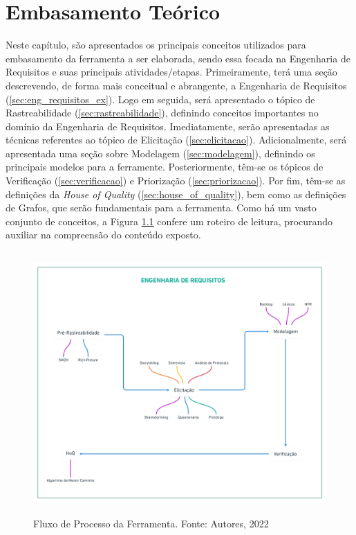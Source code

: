 \chapter[Embasamento Teórico]{Embasamento Teórico}

Neste capítulo, são apresentados os principais conceitos utilizados para embasamento da ferramenta a ser elaborada, sendo essa focada na Engenharia de Requisitos e suas principais atividades/etapas. Primeiramente, terá uma seção descrevendo, de forma mais conceitual e abrangente, a Engenharia de Requisitos (\ref{sec:eng_requisitos_ex}). Logo em seguida, será apresentado o tópico de Rastreabilidade (\ref{sec:rastreabilidade}), definindo conceitos importantes no domínio da Engenharia de Requisitos. Imediatamente, serão apresentadas as técnicas referentes ao tópico de Elicitação (\ref{sec:elicitacao}). Adicionalmente, será apresentada uma seção sobre Modelagem (\ref{sec:modelagem}), definindo os principais modelos para a ferramente. Posteriormente, têm-se os tópicos de Verificação (\ref{sec:verificacao}) e Priorização (\ref{sec:priorizacao}). Por fim, têm-se as definições da \textit{House of Quality} (\ref{sec:house_of_quality}), bem como as definições de Grafos, que serão fundamentais para a ferramenta. Como há um vasto conjunto de conceitos, a Figura \ref{fig:roadmap} confere um roteiro de leitura, procurando auxiliar na compreensão do conteúdo exposto.

\begin{figure}[H]
        \begin{center}
        \includegraphics[width=12cm, height=10cm, keepaspectratio]{figuras/Embasamento/roadmap.png}
        \caption{{Fluxo de Processo da Ferramenta. Fonte: Autores, 2022}}
        \label{fig:roadmap}
    \end{center}
\end{figure}

